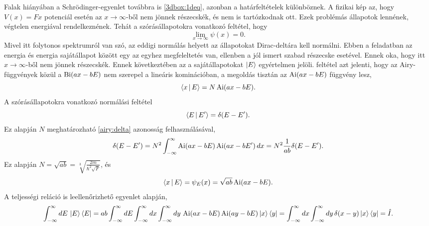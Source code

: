 Falak hiányában a Schrödinger-egyenlet továbbra is \eqref{3dbox:1deq}, azonban a határfeltételek különböznek. A fizikai kép az, hogy $V(x)=Fx$ potenciál esetén az $x\to\infty$-ből nem jönnek részecskék, és nem is tartózkodnak ott. Ezek problémás állapotok lennének, végtelen energiával rendelkeznének. Tehát a szórásállapotokra vonatkozó feltétel, hogy
\begin{equation}
	\lim_{x\to\infty}\psi(x) = 0.
	\label{nowall:oundary}
\end{equation}
Mivel itt folytonos spektrumról van szó, az eddigi normálás helyett az állapotokat Dirac-deltára kell normálni. Ebben a feladatban az energia és energia sajátállapot között egy az egyhez megfeleltetés van, ellenben a jól ismert szabad részecske esetével. Ennek oka, hogy itt $x\to\infty$-ből nem jönnek részecskék. Ennek következtében az a sajátállapotokat $\Ket{E}$ egyértelmen jelöli.
 feltétel azt jelenti, hogy az Airy-függvények közül a $\operatorname{Bi}(ax-bE)$ nem szerepel a lineáris kominációban, a megoldás tisztán az $\operatorname{Ai}(ax-bE)$ függvény lesz,
\begin{equation}
	\Braket{x|E}=N\operatorname{Ai}(ax-bE).
\end{equation}
A szórásállapotokra vonatkozó normálási feltétel
\begin{equation}
	\Braket{E|E^\prime}=\delta(E-E^\prime).
\end{equation}
Ez alapján $N$ meghatározható \eqref{airy:delta} azonosság felhasználásával,
\begin{dmath}
	\delta(E-E^\prime)=N^2\int_{-\infty}^\infty\Ai(ax-bE)\Ai(ax-bE^\prime)\,dx=N^2\frac{1}{ab}\delta(E-E^\prime).
\end{dmath}
Ez alapján $N=\sqrt{ab}=\sqrt[3]{\frac{2m}{\hbar^2\sqrt{F}}}$, és
\begin{equation}
	\Braket{x|E}=\psi_E(x)=\sqrt{ab}\operatorname{Ai}(ax-bE).
\end{equation}
A teljességi reláció is leellenőrizhető  egyenlet alapján,
\begin{dmath}
	\int_{-\infty}^\infty dE\,\Ket{E}\Bra{E}=ab\int_{-\infty}^\infty dE\int_{-\infty}^\infty dx\int_{-\infty}^\infty dy\,\Ai(ax-bE)\Ai(ay-bE)\Ket{x}\Bra{y}=\int_{-\infty}^\infty dx\int_{-\infty}^\infty dy\,\delta(x-y)\Ket{x}\Bra{y}=\op{I}.
\end{dmath}